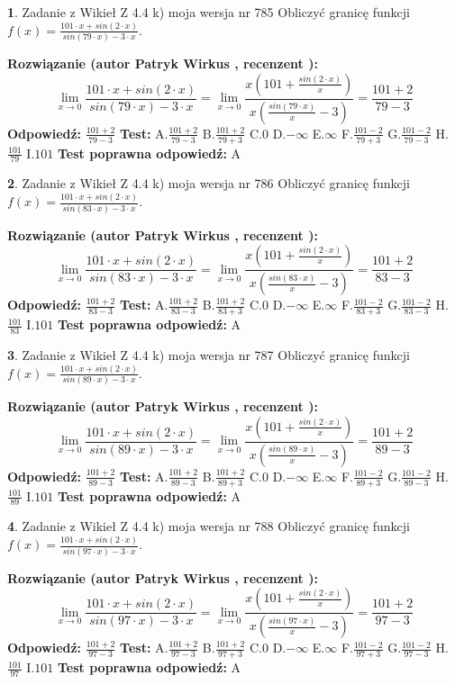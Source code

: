 \documentclass[12pt, a4paper]{article}
\theoremstyle{definition} %
\newtheorem{zad}{}
\newcommand{\zadStart}[1]{\begin{zad}#1\newline}
\newcommand{\zadStop}{\end{zad}}
\newcommand{\rozwStart}[2]{\noindent \textbf{Rozwiązanie (autor #1 , recenzent #2): }\newline}
\newcommand{\rozwStop}{\newline}
\newcommand{\odpStart}{\noindent \textbf{Odpowiedź:}\newline}
\newcommand{\odpStop}{\newline}
\newcommand{\testStart}{\noindent \textbf{Test:}\newline}
\newcommand{\testStop}{\newline}
\newcommand{\kluczStart}{\noindent \textbf{Test poprawna odpowiedź:}\newline}
\newcommand{\kluczStop}{\newline}
\begin{document}
\zadStart{Zadanie z Wikieł Z 4.4 k) moja wersja nr 785}
Obliczyć granicę funkcji $f(x)=\frac{101\cdot x +sin(2\cdot x)}{sin(79\cdot x) -3\cdot x}$.
\zadStop
\rozwStart{Patryk Wirkus}{}
$$\lim\limits_{x\to 0}\frac{101\cdot x +sin(2\cdot x)}{sin(79\cdot x) -3\cdot x}
=\lim\limits_{x\to 0}\frac{x(101+\frac{sin(2\cdot x)}{x})}{x(\frac{sin(79\cdot x)}{x}-3)}
=\frac{101+2}{79-3}$$
\rozwStop
\odpStart
$\frac{101+2}{79-3}$
\odpStop
\testStart
A.$\frac{101+2}{79-3}$
B.$\frac{101+2}{79+3}$
C.$0$
D.$-\infty$
E.$\infty$
F.$\frac{101-2}{79+3}$
G.$\frac{101-2}{79-3}$
H.$\frac{101}{79}$
I.$101$
\testStop
\kluczStart
A
\kluczStop



\zadStart{Zadanie z Wikieł Z 4.4 k) moja wersja nr 786}
Obliczyć granicę funkcji $f(x)=\frac{101\cdot x +sin(2\cdot x)}{sin(83\cdot x) -3\cdot x}$.
\zadStop
\rozwStart{Patryk Wirkus}{}
$$\lim\limits_{x\to 0}\frac{101\cdot x +sin(2\cdot x)}{sin(83\cdot x) -3\cdot x}
=\lim\limits_{x\to 0}\frac{x(101+\frac{sin(2\cdot x)}{x})}{x(\frac{sin(83\cdot x)}{x}-3)}
=\frac{101+2}{83-3}$$
\rozwStop
\odpStart
$\frac{101+2}{83-3}$
\odpStop
\testStart
A.$\frac{101+2}{83-3}$
B.$\frac{101+2}{83+3}$
C.$0$
D.$-\infty$
E.$\infty$
F.$\frac{101-2}{83+3}$
G.$\frac{101-2}{83-3}$
H.$\frac{101}{83}$
I.$101$
\testStop
\kluczStart
A
\kluczStop



\zadStart{Zadanie z Wikieł Z 4.4 k) moja wersja nr 787}
Obliczyć granicę funkcji $f(x)=\frac{101\cdot x +sin(2\cdot x)}{sin(89\cdot x) -3\cdot x}$.
\zadStop
\rozwStart{Patryk Wirkus}{}
$$\lim\limits_{x\to 0}\frac{101\cdot x +sin(2\cdot x)}{sin(89\cdot x) -3\cdot x}
=\lim\limits_{x\to 0}\frac{x(101+\frac{sin(2\cdot x)}{x})}{x(\frac{sin(89\cdot x)}{x}-3)}
=\frac{101+2}{89-3}$$
\rozwStop
\odpStart
$\frac{101+2}{89-3}$
\odpStop
\testStart
A.$\frac{101+2}{89-3}$
B.$\frac{101+2}{89+3}$
C.$0$
D.$-\infty$
E.$\infty$
F.$\frac{101-2}{89+3}$
G.$\frac{101-2}{89-3}$
H.$\frac{101}{89}$
I.$101$
\testStop
\kluczStart
A
\kluczStop



\zadStart{Zadanie z Wikieł Z 4.4 k) moja wersja nr 788}
Obliczyć granicę funkcji $f(x)=\frac{101\cdot x +sin(2\cdot x)}{sin(97\cdot x) -3\cdot x}$.
\zadStop
\rozwStart{Patryk Wirkus}{}
$$\lim\limits_{x\to 0}\frac{101\cdot x +sin(2\cdot x)}{sin(97\cdot x) -3\cdot x}
=\lim\limits_{x\to 0}\frac{x(101+\frac{sin(2\cdot x)}{x})}{x(\frac{sin(97\cdot x)}{x}-3)}
=\frac{101+2}{97-3}$$
\rozwStop
\odpStart
$\frac{101+2}{97-3}$
\odpStop
\testStart
A.$\frac{101+2}{97-3}$
B.$\frac{101+2}{97+3}$
C.$0$
D.$-\infty$
E.$\infty$
F.$\frac{101-2}{97+3}$
G.$\frac{101-2}{97-3}$
H.$\frac{101}{97}$
I.$101$
\testStop
\kluczStart
A
\kluczStop
\end{document}
